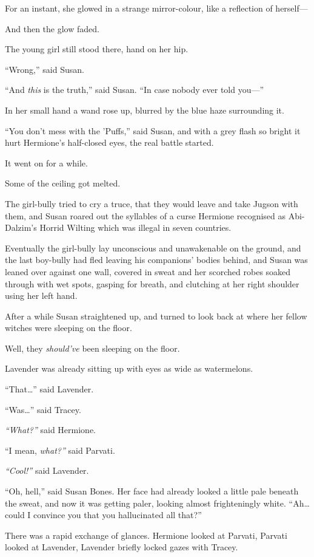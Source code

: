 For an instant, she glowed in a strange mirror-colour, like a reflection
of herself---

And then the glow faded.

The young girl still stood there, hand on her hip.

``Wrong,'' said Susan.

``And \emph{this} is the truth,'' said Susan. ``In case nobody ever told
you---''

In her small hand a wand rose up, blurred by the blue haze surrounding
it.

``You don't mess with the 'Puffs,'' said Susan, and with a grey flash so
bright it hurt Hermione's half-closed eyes, the real battle started.

It went on for a while.

Some of the ceiling got melted.

The girl-bully tried to cry a truce, that they would leave and take
Jugson with them, and Susan roared out the syllables of a curse Hermione
recognised as Abi-Dalzim's Horrid Wilting which was illegal in seven
countries.

Eventually the girl-bully lay unconscious and unawakenable on the
ground, and the last boy-bully had fled leaving his companions' bodies
behind, and Susan was leaned over against one wall, covered in sweat and
her scorched robes soaked through with wet spots, gasping for breath,
and clutching at her right shoulder using her left hand.

After a while Susan straightened up, and turned to look back at where
her fellow witches were sleeping on the floor.

Well, they \emph{should've} been sleeping on the floor.

Lavender was already sitting up with eyes as wide as watermelons.

``That\ldots{}'' said Lavender.

``Was\ldots{}'' said Tracey.

\emph{``What?''} said Hermione.

``I mean, \emph{what?''} said Parvati.

\emph{``Cool!''} said Lavender.

``Oh, hell,'' said Susan Bones. Her face had already looked a little
pale beneath the sweat, and now it was getting paler, looking almost
frighteningly white. ``Ah\ldots{} could I convince you that you
hallucinated all that?''

There was a rapid exchange of glances. Hermione looked at Parvati,
Parvati looked at Lavender, Lavender briefly locked gazes with Tracey.

